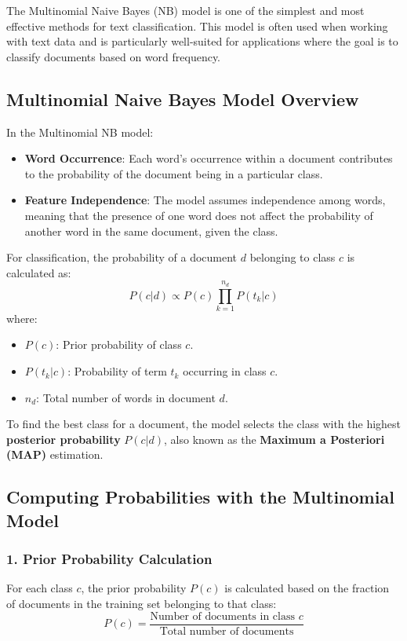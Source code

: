 \documentclass{article}
\begin{document}
The Multinomial Naive Bayes (NB) model is one of the simplest and most effective methods for text classification. This model is often used when working with text data and is particularly well-suited for applications where the goal is to classify documents based on word frequency.

\subsection*{Multinomial Naive Bayes Model Overview}

In the Multinomial NB model:
\begin{itemize}
    \item \textbf{Word Occurrence}: Each word’s occurrence within a document contributes to the probability of the document being in a particular class.
    \item \textbf{Feature Independence}: The model assumes independence among words, meaning that the presence of one word does not affect the probability of another word in the same document, given the class.
\end{itemize}

For classification, the probability of a document \( d \) belonging to class \( c \) is calculated as:
\[
P(c|d) \propto P(c) \prod_{k=1}^{n_d} P(t_k|c)
\]
where:
\begin{itemize}
    \item \( P(c) \): Prior probability of class \( c \).
    \item \( P(t_k|c) \): Probability of term \( t_k \) occurring in class \( c \).
    \item \( n_d \): Total number of words in document \( d \).
\end{itemize}

To find the best class for a document, the model selects the class with the highest \textbf{posterior probability} \( P(c|d) \), also known as the \textbf{Maximum a Posteriori (MAP)} estimation.

\subsection*{Computing Probabilities with the Multinomial Model}

\subsubsection*{1. Prior Probability Calculation}
For each class \( c \), the prior probability \( P(c) \) is calculated based on the fraction of documents in the training set belonging to that class:
\[
P(c) = \frac{\text{Number of documents in class } c}{\text{Total number of documents}}
\]
\end{document}
